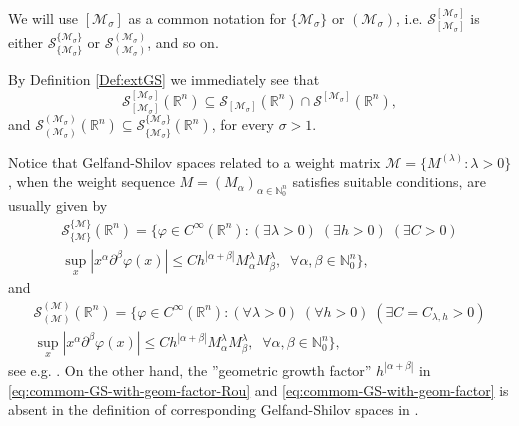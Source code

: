 \documentclass{article}
\theoremstyle{thmstyleone}
\theoremstyle{thmstyletwo}%
\theoremstyle{thmstylethree}%
\begin{document}
We will use $[\mathcal{M}_\sigma]$ as a common notation for 
$\{ \mathcal{M}_\sigma \}$ or $(\mathcal{M}_\sigma )$, i.e.
$\mathcal S_{[\mathcal{M}_\sigma]}^{[\mathcal{M}_\sigma]} $ is either
$ \mathcal  S_{\{\mathcal{M}_\sigma\}}^{\{\mathcal{M}_\sigma\}}$
or $ \mathcal S_{(\mathcal{M}_\sigma)}^{(\mathcal{M}_\sigma)}$, and so on.

\par

By Definition \ref{Def:extGS} we immediately see that 
\begin{equation}\label{eq:incl}
    \mathcal S_{[\mathcal{M}_\sigma]}^{[\mathcal{M}_\sigma]} (\mathbb R^n) \subseteq \mathcal S_{[\mathcal{M}_\sigma]} (\mathbb R^n)\cap \mathcal S^{[\mathcal{M}_\sigma]} (\mathbb R^n),
\end{equation}
and $\mathcal S_{(\mathcal{M}_\sigma)}^{(\mathcal{M}_\sigma)} (\mathbb R^n) \subseteq \mathcal S_{\{\mathcal{M}_\sigma\}}^{\{\mathcal{M}_\sigma\}} (\mathbb R^n)$, 
for every $\sigma>1.$

\par

Notice that Gelfand-Shilov spaces related to a 
weight matrix $\mathcal{M} =\{ M ^{(\lambda)} :\lambda>0\}$, when the weight sequence  
$M = ( M_{\alpha})_{\alpha\in \mathbb N_0 ^n}$  satisfies suitable conditions,
are usually given by
\begin{multline} \label{eq:commom-GS-with-geom-factor-Rou}
    \mathscr S_{\{\mathcal{M} \}}^{\{\mathcal{M} \}} (\mathbb R^n)  =
   \Big \{ \varphi \in C^{\infty} (\mathbb R^n) \colon
    (\exists \lambda >0) \;(\exists h>0)\;(\exists C >0) \\
   \sup_{x} |x^\alpha \partial^\beta \varphi(x)|\leq 
   C h^{|\alpha + \beta|} M^{\lambda}_\alpha M^{\lambda}_\beta,
   \;\; \forall \alpha,\beta\in\mathbb N_0^n
   \Big\},
\end{multline}
and
\begin{multline} \label{eq:commom-GS-with-geom-factor}
    \mathscr S_{(\mathcal{M} )}^{(\mathcal{M} )} (\mathbb R^n)  =
    \Big\{ \varphi \in C^{\infty} (\mathbb R^n) \colon
    (\forall \lambda >0) \;(\forall h>0)\;(\exists C = C_{\lambda, h}>0) \\
   \sup_{x} |x^\alpha \partial^\beta \varphi(x)|\leq 
   C h^{|\alpha + \beta|} M^{\lambda}_\alpha M^{\lambda}_\beta,
   \;\; \forall \alpha,\beta\in\mathbb N_0^n
   \Big\},
\end{multline}
see e.g. \cite[(2.16)]{BJOS-2021}. On the other hand, the ''geometric growth factor'' 
$h^{|\alpha + \beta|}$  
in  \eqref{eq:commom-GS-with-geom-factor-Rou} and \eqref{eq:commom-GS-with-geom-factor}
is absent in the  definition of corresponding
Gelfand-Shilov spaces in \cite[(3.1)]{DNV2021}.
\end{document}
